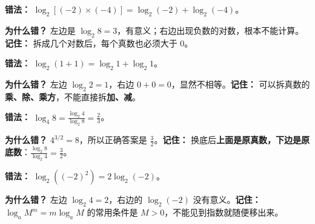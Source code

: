 \begin{trapbox}
	\begin{description}[style=nextline, leftmargin=2.8em, labelsep=0.5em, itemsep=0.45em]
		\item[\textbf{\textcolor{CTrap}{易错点一（真数不检查）：}}]
			\textbf{错法：} $\log_2[(-2)\times(-4)]=\log_2(-2)+\log_2(-4)$。

			\textbf{为什么错？} 左边是 $\log_2 8=3$，有意义；右边出现负数的对数，根本不能计算。\textbf{记住：} 拆成几个对数后，每个真数也必须大于 $0$。

		\item[\textbf{\textcolor{CTrap}{易错点二（把加法也拆开）：}}]
			\textbf{错法：} $\log_2(1+1)=\log_2 1+\log_2 1$。

			\textbf{为什么错？} 左边 $\log_2 2=1$，右边 $0+0=0$，显然不相等。\textbf{记住：} 可以拆真数的\textbf{乘、除、乘方}，不能直接拆\textbf{加、减}。

		\item[\textbf{\textcolor{CTrap}{易错点三（换底颠倒）：}}]
			\textbf{错法：} $\log_4 8=\frac{\log_2 4}{\log_2 8}=\frac23$。

			\textbf{为什么错？} $4^{3/2}=8$，所以正确答案是 $\frac32$。\textbf{记住：} 换底后\textbf{上面是原真数，下边是原底数}：$\frac{\log_2 8}{\log_2 4}=\frac32$。

		\item[\textbf{\textcolor{CTrap}{易错点四（平方后忘记检查）：}}]
			\textbf{错法：} $\log_2((-2)^2)=2\log_2(-2)$。

			\textbf{为什么错？} 左边 $\log_2 4=2$，右边的 $\log_2(-2)$ 没有意义。\textbf{记住：} $\log_a M^m=m\log_a M$ 的常用条件是 $M>0$，不能见到指数就随便移出来。
	\end{description}
\end{trapbox}
